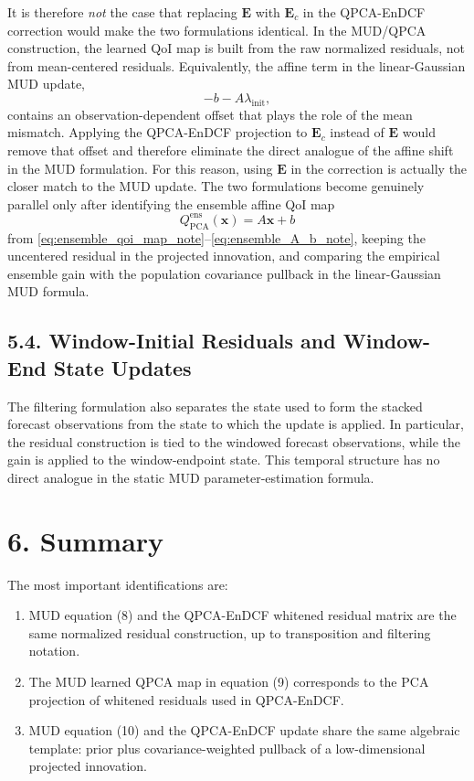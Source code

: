 \documentclass[11pt]{article}
\begin{document}
It is therefore \emph{not} the case that replacing $\mathbf{E}$ with $\mathbf{E}_c$ in the QPCA-EnDCF correction would make the two formulations identical. In the MUD/QPCA construction, the learned QoI map is built from the raw normalized residuals, not from mean-centered residuals. Equivalently, the affine term in the linear-Gaussian MUD update,
\begin{equation}
-b-A\lambda_{\mathrm{init}},
\end{equation}
contains an observation-dependent offset that plays the role of the mean mismatch. Applying the QPCA-EnDCF projection to $\mathbf{E}_c$ instead of $\mathbf{E}$ would remove that offset and therefore eliminate the direct analogue of the affine shift in the MUD formulation. For this reason, using $\mathbf{E}$ in the correction is actually the closer match to the MUD update. The two formulations become genuinely parallel only after identifying the ensemble affine QoI map
\begin{equation}
Q_{\mathrm{PCA}}^{\mathrm{ens}}(\mathbf{x}) = A\mathbf{x}+b
\end{equation}
from \eqref{eq:ensemble_qoi_map_note}--\eqref{eq:ensemble_A_b_note}, keeping the uncentered residual in the projected innovation, and comparing the empirical ensemble gain with the population covariance pullback in the linear-Gaussian MUD formula.

\subsection*{5.4. Window-Initial Residuals and Window-End State Updates}

The filtering formulation also separates the state used to form the stacked forecast observations from the state to which the update is applied. In particular, the residual construction is tied to the windowed forecast observations, while the gain is applied to the window-endpoint state. This temporal structure has no direct analogue in the static MUD parameter-estimation formula.

\section*{6. Summary}

The most important identifications are:
\begin{enumerate}
\item MUD equation (8) and the QPCA-EnDCF whitened residual matrix are the same normalized residual construction, up to transposition and filtering notation.
\item The MUD learned QPCA map in equation (9) corresponds to the PCA projection of whitened residuals used in QPCA-EnDCF.
\item MUD equation (10) and the QPCA-EnDCF update share the same algebraic template: prior plus covariance-weighted pullback of a low-dimensional projected innovation.
\end{enumerate}
\end{document}
